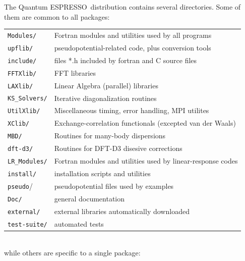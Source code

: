 \documentclass[12pt,a4paper]{article}
\def\qe{{\sc Quantum ESPRESSO}}
\begin{document}

The \qe\ distribution contains several directories. Some of them are
common to all packages:

\begin{tabular}{ll}
\texttt{Modules/}    & Fortran modules and utilities used by all programs\\
\texttt{upflib/}     & pseudopotential-related code, plus conversion tools\\
\texttt{include/}    & files *.h included by fortran and C source files\\
\texttt{FFTXlib/}    & FFT libraries\\
\texttt{LAXlib/}     & Linear Algebra (parallel) libraries\\
\texttt{KS\_Solvers/}& Iterative diagonalization routines\\
\texttt{UtilXlib/}   & Miscellaneous timing, error handling, MPI utilites\\
\texttt{XClib/}      & Exchange-correlation functionals (excepted van der Waals)\\
\texttt{MBD/}        & Routines for many-body dispersions\\
\texttt{dft-d3/}     & Routines for DFT-D3 disesive corrections\\
\texttt{LR\_Modules/}& Fortran modules and utilities used by linear-response codes\\
\texttt{install/}    & installation scripts and utilities\\
\texttt{pseudo}/     & pseudopotential files used by examples\\
\texttt{Doc/}        & general documentation\\
\texttt{external/}   & external libraries automatically downloaded\\
\texttt{test-suite/} & automated tests
\end{tabular}
\\
while others are specific to a single package:
\end{document}

